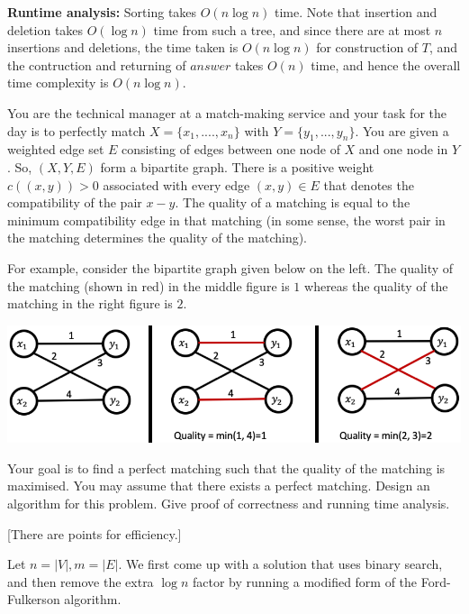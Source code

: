 \documentclass[answers]{exam}
\begin{document}
\begin{questions}
\begin{solution}
    \textbf{Runtime analysis:}
    Sorting takes $O(n \log n)$ time.
    Note that insertion and deletion takes $O(\log n)$ time from such a tree, and since there are at most $n$ insertions and deletions, the time taken is $O(n \log n)$ for construction of $T$, and
    the contruction and returning of $answer$ takes $O(n)$ time, and hence the overall time complexity is $O(n \log n)$.

\end{solution}

\question[8]

You are the technical manager at a match-making service and your task for the day is to perfectly match $X = \{x_1, ...., x_n\}$ with $Y = \{y_1, ..., y_n\}$. You are given a weighted edge set $E$
consisting of edges between one node of $X$ and one node in $Y$. So, $(X, Y, E)$ form a bipartite graph. There is a positive weight $c((x, y)) > 0$ associated with every edge $(x, y) \in E$ that
denotes the compatibility of the pair $x-y$. The quality of a matching is equal to the minimum compatibility edge in that matching (in some sense, the worst pair in the matching determines the quality of the matching).

For example, consider the bipartite graph given below on the left. The quality of the matching (shown in red) in the middle figure is $1$ whereas the quality of the matching in the right figure is
$2$.

\begin{center}
    \includegraphics[scale=0.4]{major/Match.png}
\end{center}

Your goal is to find a perfect matching such that the quality of the matching is maximised. You may assume that there exists a perfect matching. Design an algorithm for this problem. Give proof of correctness and running time analysis.

[There are points for efficiency.]
\begin{solution}

    Let $n = |V|, m = |E|$. We first come up with a solution that uses binary search, and then remove the extra $\log n$ factor by running a modified form of the Ford-Fulkerson algorithm.


\end{solution}
\end{questions}
\end{document}
